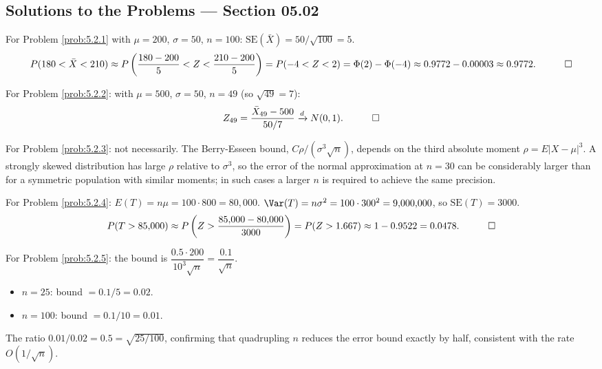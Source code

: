 \subsection*{Solutions to the Problems --- Section 05.02}

\begin{solucion}
	\label{sol:5.2.1}
	For Problem \ref{prob:5.2.1} with $\mu=200$, $\sigma=50$, $n=100$: $\text{SE}(\bar X)=50/\sqrt{100}=5$.
	\begin{align*}
		P(180 < \bar X < 210) \approx P\left(\frac{180-200}{5} < Z < \frac{210-200}{5}\right) = P(-4 < Z < 2) = \Phi(2)-\Phi(-4) \approx 0.9772-0.00003 \approx 0.9772. \quad \qedhere
	\end{align*}
\end{solucion}

\begin{solucion}
	\label{sol:5.2.2}
	For Problem \ref{prob:5.2.2}: with $\mu=500$, $\sigma=50$, $n=49$ (so $\sqrt{49}=7$):
	\begin{align*}
		Z_{49} = \frac{\bar X_{49} - 500}{50/7} \xrightarrow{d} N(0,1). \quad \qedhere
	\end{align*}
\end{solucion}

\begin{solucion}
	\label{sol:5.2.3}
	For Problem \ref{prob:5.2.3}: not necessarily. The Berry-Esseen bound, $C\rho/(\sigma^3\sqrt n)$, depends on the third absolute moment $\rho=E|X-\mu|^3$. A strongly skewed distribution has large $\rho$ relative to $\sigma^3$, so the error of the normal approximation at $n=30$ can be considerably larger than for a symmetric population with similar moments; in such cases a larger $n$ is required to achieve the same precision. \quad \qedhere
\end{solucion}

\begin{solucion}
	\label{sol:5.2.4}
	For Problem \ref{prob:5.2.4}: $E(T) = n\mu = 100\cdot 800 = 80{,}000$. $\Var(T) = n\sigma^2 = 100\cdot 300^2 = 9{,}000{,}000$, so $\text{SE}(T)=3000$.
	\begin{align*}
		P(T > 85{,}000) \approx P\left(Z > \frac{85{,}000-80{,}000}{3000}\right) = P(Z > 1.667) \approx 1-0.9522 = 0.0478. \quad \qedhere
	\end{align*}
\end{solucion}

\begin{solucion}
	\label{sol:5.2.5}
	For Problem \ref{prob:5.2.5}: the bound is $\dfrac{0.5\cdot 200}{10^3\sqrt n} = \dfrac{0.1}{\sqrt n}$.
	\begin{itemize}
		\item $n=25$: bound $= 0.1/5 = 0.02$.
		\item $n=100$: bound $= 0.1/10 = 0.01$.
	\end{itemize}
	The ratio $0.01/0.02 = 0.5 = \sqrt{25/100}$, confirming that quadrupling $n$ reduces the error bound exactly by half, consistent with the rate $O(1/\sqrt n)$. \quad \qedhere
\end{solucion}

